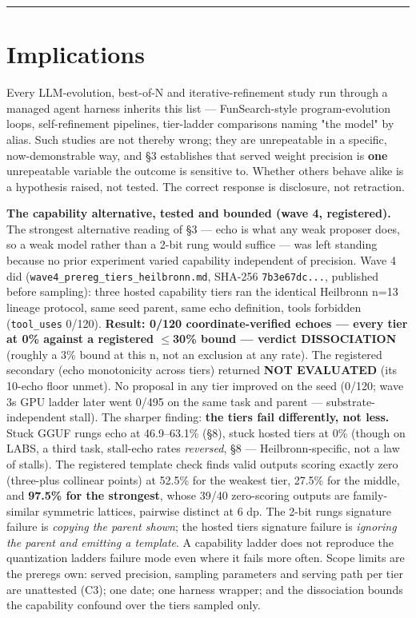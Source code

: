 \begin{center}\rule{0.5\linewidth}{0.5pt}\end{center}

\hypertarget{implications}{%
\section{Implications}\label{implications}}

Every LLM-evolution, best-of-N and iterative-refinement study run through a managed agent harness inherits this list --- FunSearch-style program-evolution loops, self-refinement pipelines, tier-ladder comparisons naming "the model" by alias. Such studies are not thereby wrong; they are unrepeatable in a specific, now-demonstrable way, and §3 establishes that served weight precision is \textbf{one} unrepeatable variable the outcome is sensitive to. Whether others behave alike is a hypothesis raised, not tested. The correct response is disclosure, not retraction.

\textbf{The capability alternative, tested and bounded (wave 4, registered).} The strongest alternative reading of §3 --- echo is what any weak proposer does, so a weak model rather than a 2-bit rung would suffice --- was left standing because no prior experiment varied capability independent of precision. Wave 4 did (\texttt{wave4\_prereg\_tiers\_heilbronn.md}, SHA-256 \texttt{7b3e67dc...}, published before sampling): three hosted capability tiers ran the identical Heilbronn n=13 lineage protocol, same seed parent, same echo definition, tools forbidden (\texttt{tool\_uses} 0/120). \textbf{Result: 0/120 coordinate-verified echoes --- every tier at 0\% against a registered \(\leq\)30\% bound --- verdict DISSOCIATION} (roughly a 3\% bound at this n, not an exclusion at any rate). The registered secondary (echo monotonicity across tiers) returned \textbf{NOT EVALUATED} (its 10-echo floor unmet). No proposal in any tier improved on the seed (0/120; wave 3\textquotesingle s GPU ladder later went 0/495 on the same task and parent --- substrate-independent stall). The sharper finding: \textbf{the tiers fail differently, not less.} Stuck GGUF rungs echo at 46.9--63.1\% (§8), stuck hosted tiers at 0\% (though on LABS, a third task, stall-echo rates \emph{reversed}, §8 --- Heilbronn-specific, not a law of stalls). The registered template check finds valid outputs scoring exactly zero (three-plus collinear points) at 52.5\% for the weakest tier, 27.5\% for the middle, and \textbf{97.5\% for the strongest}, whose 39/40 zero-scoring outputs are family-similar symmetric lattices, pairwise distinct at 6 dp. The 2-bit rung\textquotesingle s signature failure is \emph{copying the parent shown}; the hosted tiers\textquotesingle{} signature failure is \emph{ignoring the parent and emitting a template}. A capability ladder does not reproduce the quantization ladder\textquotesingle s failure mode even where it fails more often. Scope limits are the prereg\textquotesingle s own: served precision, sampling parameters and serving path per tier are unattested (C3); one date; one harness wrapper; and the dissociation bounds the capability confound over the tiers sampled only.

